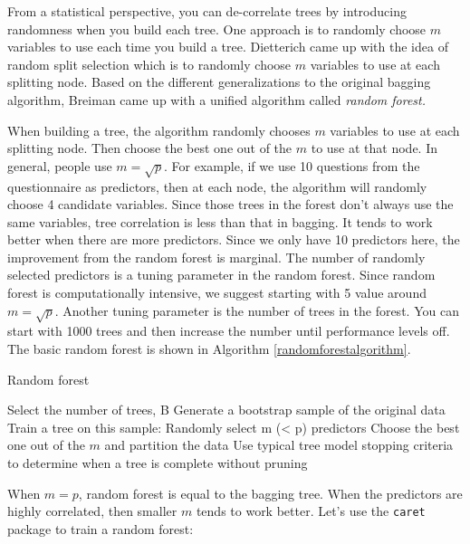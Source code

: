 \documentclass[12pt,]{krantz}
\begin{document}
From a statistical perspective, you can de-correlate trees by introducing randomness when you build each tree. One approach \citep{Ho1998, amit1997} is to randomly choose \(m\) variables to use each time you build a tree. Dietterich\citep{Dietterich2000} came up with the idea of random split selection which is to randomly choose \(m\) variables to use at each splitting node. Based on the different generalizations to the original bagging algorithm, Breiman \citep{Breiman2001} came up with a unified algorithm called \emph{random forest.}

When building a tree, the algorithm randomly chooses \(m\) variables to use at each splitting node. Then choose the best one out of the \(m\) to use at that node. In general, people use \(m=\sqrt{p}\). For example, if we use 10 questions from the questionnaire as predictors, then at each node, the algorithm will randomly choose 4 candidate variables. Since those trees in the forest don't always use the same variables, tree correlation is less than that in bagging. It tends to work better when there are more predictors. Since we only have 10 predictors here, the improvement from the random forest is marginal. The number of randomly selected predictors is a tuning parameter in the random forest. Since random forest is computationally intensive, we suggest starting with 5 value around \(m=\sqrt{p}\). Another tuning parameter is the number of trees in the forest. You can start with 1000 trees and then increase the number until performance levels off. The basic random forest is shown in Algorithm \ref{randomforestalgorithm}.

\begin{algorithm}
\caption{Random forest}\label{randomforestalgorithm} 
\begin{algorithmic}[1] 
\State Select the number of trees, B
        \State Generate a bootstrap sample of the original data
        \State Train a tree on this sample:
                \State Randomly select m (< p) predictors
                \State Choose the best one out of the $m$ and partition the data
            \EndFor
        \State Use typical tree model stopping criteria to determine when a tree is complete without pruning
    \EndFor
\end{algorithmic}
\end{algorithm}

When \(m=p\), random forest is equal to the bagging tree. When the predictors are highly correlated, then smaller \(m\) tends to work better. Let's use the \texttt{caret} package to train a random forest:
\end{document}
